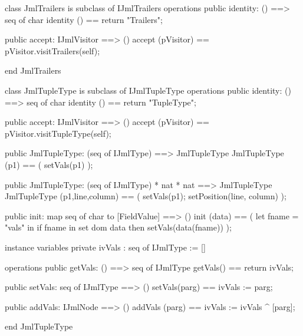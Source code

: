\begin{vdm_al}
class JmlTrailers is subclass of IJmlTrailers
operations
  public identity: () ==> seq of char
  identity () == return "Trailers";

  public accept: IJmlVisitor ==> ()
  accept (pVisitor) == pVisitor.visitTrailers(self);

end JmlTrailers
\end{vdm_al}
\begin{vdm_al}
class JmlTupleType is subclass of IJmlTupleType
operations
  public identity: () ==> seq of char
  identity () == return "TupleType";

  public accept: IJmlVisitor ==> ()
  accept (pVisitor) == pVisitor.visitTupleType(self);

  public JmlTupleType:
    (seq of IJmlType) ==> JmlTupleType
  JmlTupleType (p1) == 
    ( setVals(p1) );

  public JmlTupleType:
    (seq of IJmlType) *
    nat *
    nat ==> JmlTupleType
  JmlTupleType (p1,line,column) == 
    ( setVals(p1);
      setPosition(line, column) );

  public init: map seq of char to [FieldValue] ==> ()
  init (data) ==
    ( let fname = "vals" in
        if fname in set dom data
        then setVals(data(fname)) );

instance variables
  private ivVals : seq of IJmlType := []

operations
  public getVals: () ==> seq of IJmlType
  getVals() == return ivVals;

  public setVals: seq of IJmlType ==> ()
  setVals(parg) == ivVals := parg;

  public addVals: IJmlNode ==> ()
  addVals (parg) == ivVals := ivVals ^ [parg];

end JmlTupleType
\end{vdm_al}

